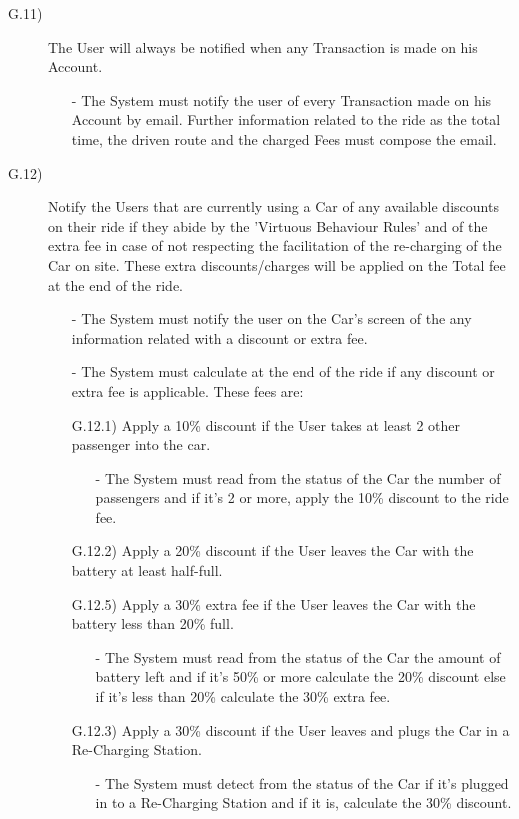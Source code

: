 \documentclass[a4paper]{article}
\begin{document}
\begin{description}
\begin{itemize}
\end{itemize}
\item [G.11)]The User will always be notified when any Transaction is made on his Account.
\begin{itemize}
	\item[-]The System must notify the user of every Transaction made on his Account by email. Further information related to the ride as the total time, the driven route and the charged Fees must compose the email.
\end{itemize}
\item [G.12)]Notify the Users that are currently using a Car of any available discounts on their ride if they abide by the 'Virtuous Behaviour Rules' and of the extra fee in case of not respecting the facilitation of the re-charging of the Car on site. These extra discounts/charges will be applied on the Total fee at the end of the ride.
\begin{itemize}
	\item[-]The System must notify the user on the Car's screen of the any information related with a discount or extra fee.
  	\item[-]The System must calculate at the end of the ride if any discount or extra fee is applicable. These fees are:
	\item [G.12.1)]Apply a 10\% discount if the User takes at least 2 other passenger into the car.
	\begin{itemize}
	\item[-]The System must read from the status of the Car the number of passengers and if it's 2 or more, apply the 10\% discount to the ride fee.
	\end{itemize}
	\item [G.12.2)]Apply a 20\% discount if the User leaves the Car with the battery at least half-full.
	\item [G.12.5)]Apply a 30\% extra fee if the User leaves the Car with the battery less than 20\% full.
	\begin{itemize}
	\item[-]The System must read from the status of the Car the amount of battery left and if it's 50\% or more calculate the 20\% discount else if it's less than 20\% calculate the 30\% extra fee.
	\end{itemize}
	\item [G.12.3)]Apply a 30\% discount if the User leaves and plugs the Car in a Re-Charging Station.
	\begin{itemize}
	\item[-]The System must detect from the status of the Car if it's plugged in to a Re-Charging Station and if it is, calculate the 30\% discount.

\end{itemize}
\end{itemize}
\end{description}
\end{document}
